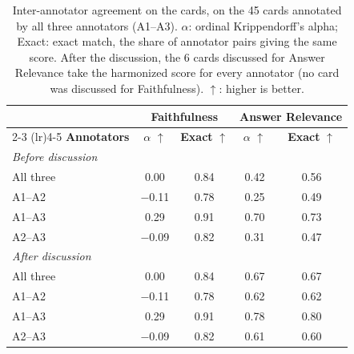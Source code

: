 \begin{table}[t]
\centering
\small
\caption{Inter-annotator agreement on the cards, on the 45 cards annotated by all three annotators (A1--A3). $\alpha$: ordinal Krippendorff's alpha; Exact: exact match, the share of annotator pairs giving the same score. After the discussion, the 6 cards discussed for Answer Relevance take the harmonized score for every annotator (no card was discussed for Faithfulness). $\uparrow$: higher is better.}
\label{tab:cards-agreement}
\begin{tabular}{lcccc}
\toprule
 & \multicolumn{2}{c}{\textbf{Faithfulness}} & \multicolumn{2}{c}{\textbf{Answer Relevance}} \\
\cmidrule(lr){2-3} \cmidrule(lr){4-5}
\textbf{Annotators} & \textbf{$\alpha$} $\uparrow$ & \textbf{Exact} $\uparrow$ & \textbf{$\alpha$} $\uparrow$ & \textbf{Exact} $\uparrow$ \\
\midrule
\multicolumn{5}{l}{\textit{Before discussion}} \\
All three & 0.00 & 0.84 & 0.42 & 0.56 \\
A1--A2 & $-$0.11 & 0.78 & 0.25 & 0.49 \\
A1--A3 & 0.29 & 0.91 & 0.70 & 0.73 \\
A2--A3 & $-$0.09 & 0.82 & 0.31 & 0.47 \\
\midrule
\multicolumn{5}{l}{\textit{After discussion}} \\
All three & 0.00 & 0.84 & 0.67 & 0.67 \\
A1--A2 & $-$0.11 & 0.78 & 0.62 & 0.62 \\
A1--A3 & 0.29 & 0.91 & 0.78 & 0.80 \\
A2--A3 & $-$0.09 & 0.82 & 0.61 & 0.60 \\
\bottomrule
\end{tabular}
\end{table}
